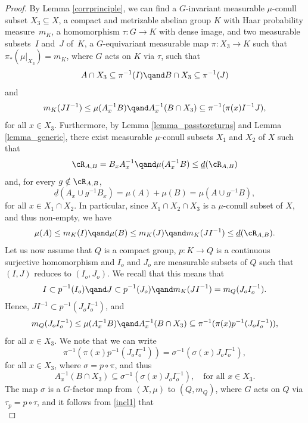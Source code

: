 \begin{proof}
By Lemma \ref{corrprinciple}, we can find a $G$-invariant measurable $\mu$-conull subset \hbox{$X_3 \subseteq X$}, a compact and
metrizable abelian group $K$ with Haar probability measure~$m_K$, a homomorphism $\tau : G \to K$ with dense image,
and two measurable subsets~$I$ and~$J$ of~$K$, a $G$-equivariant measurable map $\pi : X_3 \to K$ such that
$\pi_*(\mu |_{X_3}) = m_K$, where $G$ acts on $K$ via $\tau$, such that
\begin{equation}
\label{incl1}
A \cap X_3 \subseteq \pi^{-1}(I) \qand B \cap X_3 \subseteq \pi^{-1}(J)
\end{equation}
and
\[
m_K(JI^{-1}) \leq \mu(A_x^{-1}B)
\qand
A_x^{-1}(B \cap X_3) \subseteq \pi^{-1}(\pi(x) I^{-1}J),
\]
for all $x \in X_3$. Furthermore, by Lemma \ref{lemma_passtoreturns} and Lemma \ref{lemma_generic}, there exist measurable
$\mu$-conull subsets $X_1$ and $X_2$ of $X$
such that
\[
\cR_{A,B} = B_x A_x^{-1} \qand \mu(A_x^{-1}B) \leq \underline{d}(\cR_{A,B})
\]
and, for every $g \notin \cR_{A,B}$,
\begin{equation}
\label{recall_overshoot}
\underline{d}(A_x \cup g^{-1}B_x) = \mu(A) + \mu(B) = \mu(A \cup g^{-1}B),
\end{equation}
for all $x \in X_1 \cap X_2$. In particular, since $X_1 \cap X_2 \cap X_3$ is a $\mu$-conull subset of $X$, and thus non-empty, we have
\[
\mu(A) \leq m_K(I) \qand \mu(B) \leq m_K(J) \qand m_K(JI^{-1}) \leq \underline{d}(\cR_{A,B}).
\]
Let us now assume that $Q$ is a compact group, $p : K \to Q$ is a continuous surjective homomorphism and $I_o$ and $J_o$ are
measurable subsets of $Q$ such that $(I,J)$ reduces to $(I_o,J_o)$. We recall that this means that
\[
I \subset p^{-1}(I_o) \qand J \subset p^{-1}(J_o) \qand m_K(JI^{-1}) = m_Q(J_o I_o^{-1}).
\]
Hence, $J I^{-1} \subset p^{-1}(J_o I_o^{-1})$, and
\[
m_Q(J_oI_o^{-1}) \leq \mu(A_x^{-1}B)
\qand
A_x^{-1}(B \cap X_3) \subseteq \pi^{-1}(\pi(x) p^{-1}(J_o I_o^{-1})),
\]
for all $x \in X_3$.
We note that we can write
\[
\pi^{-1}(\pi(x) p^{-1}(J_o I_o^{-1})) = \sigma^{-1}(\sigma(x) J_o I_o^{-1}),
\]
for all $x \in X_3$, where $\sigma = p \circ \pi$, and thus
\begin{equation}
A_x^{-1}(B \cap X_3) \subseteq \sigma^{-1}(\sigma(x) J_o I_o^{-1}), \quad \textrm{for all $x \in X_3$}.
\end{equation}
The map $\sigma$ is a $G$-factor map from $(X,\mu)$ to $(Q,m_Q)$, where $G$ acts on
$Q$ via $\tau_p = p \circ \tau$, and it follows from \eqref{incl1} that
\begin{equation}

\end{equation}
\end{proof}
